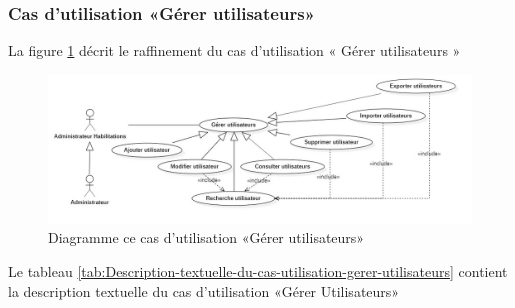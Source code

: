 \subsubsection{Cas d’utilisation «Gérer utilisateurs»}
La figure \ref{fig:usecase-gestion-users} décrit le raffinement du cas d’utilisation « Gérer utilisateurs »
\begin{figure}[H]
	\centering
	\includegraphics[width=1\linewidth]{"img/conception/usecases/sprint 1/usecase-gestion-users"}
	\caption[Cas d’utilisation «Gérer utilisateurs»]{Diagramme ce cas d’utilisation «Gérer utilisateurs»}
	\label{fig:usecase-gestion-users}
\end{figure}
Le tableau \ref{tab:Description-textuelle-du-cas-utilisation-gerer-utilisateurs} contient la description textuelle du cas d’utilisation «Gérer Utilisateurs»\\

